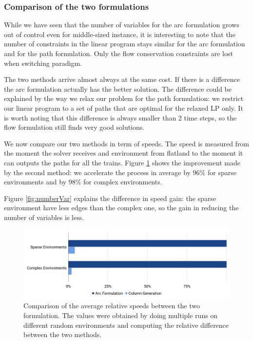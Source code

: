 \documentclass[14pt,a4paper]{article}
\theoremstyle{definition}
\numberwithin{equation}{subsection}
\begin{document}
\subsubsection{Comparison of the two formulations}

While we have seen that the number of variables for the arc formulation grows out of control even for middle-sized instance, it is interesting to note that the number of constraints in the linear program stays similar for the arc formulation and for the path formulation. Only the flow conservation constraints are lost when switching paradigm.

The two methods arrive almost always at the same cost. If there is a difference the arc formulation actually has the better solution. The difference could be explained by the way we relax our problem for the path formulation: we restrict our linear program to a set of paths that are optimal for the relaxed LP only. It is worth noting that this difference is always smaller than 2 time steps, so the flow formulation still finds very good solutions.

We now compare our two methods in term of speeds. The speed is measured from the moment the solver receives and environment from flatland to the moment it can outputs the paths for all the trains. Figure \ref{fig:comparison} shows the improvement made by the second method: we accelerate the process in average by $96\%$ for sparse environments and by $98\%$ for complex environments.

Figure \ref{fig:numberVar} explains the difference in speed gain: the sparse environment have less edges than the complex one, so the gain in reducing the number of variables is less. 

\begin{figure}[h]
	\centering
	\includegraphics[width=\linewidth]{img/comparison.png}
	\caption{Comparison of the average relative speeds between the two formulation. The values were obtained by doing multiple runs on different random environments and computing the relative difference between the two methods.}
	\label{fig:comparison}
\end{figure}
\end{document}
